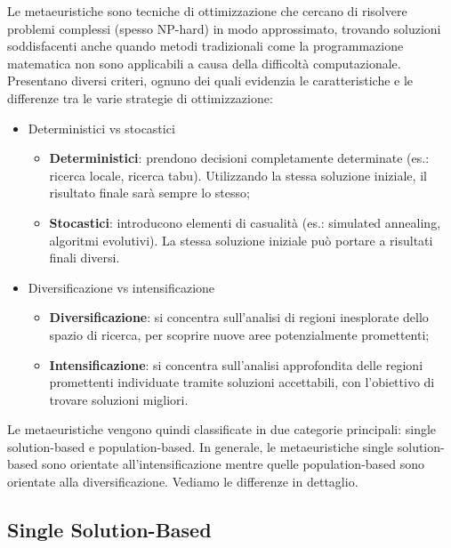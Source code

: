 Le metaeuristiche sono tecniche di ottimizzazione che cercano di risolvere problemi complessi (spesso NP-hard) in modo approssimato, trovando soluzioni soddisfacenti anche quando metodi tradizionali come la programmazione matematica non sono applicabili a causa della difficoltà computazionale. Presentano diversi criteri, ognuno dei quali evidenzia le caratteristiche e le differenze tra le varie strategie di ottimizzazione:
\begin{itemize}
    \item Deterministici vs stocastici
    \begin{itemize}
        \item \textbf{Deterministici}: prendono decisioni completamente determinate (es.: ricerca locale, ricerca tabu). Utilizzando la stessa soluzione iniziale, il risultato finale sarà sempre lo stesso;
        \item \textbf{Stocastici}: introducono elementi di casualità (es.: simulated annealing, algoritmi evolutivi). La stessa soluzione iniziale può portare a risultati finali diversi.
    \end{itemize}
     
    \item Diversificazione vs intensificazione
    \begin{itemize}
        \item \textbf{Diversificazione}: si concentra sull'analisi di regioni inesplorate dello spazio di ricerca, per scoprire nuove aree potenzialmente promettenti;
        \item \textbf{Intensificazione}: si concentra sull'analisi approfondita delle regioni promettenti individuate tramite soluzioni accettabili, con l'obiettivo di trovare soluzioni migliori.
    \end{itemize}
\end{itemize}

Le metaeuristiche vengono quindi classificate in due categorie principali: single solution-based e population-based. In generale, le metaeuristiche single solution-based sono orientate all'intensificazione mentre quelle population-based sono orientate alla diversificazione.
Vediamo le differenze in dettaglio.

\subsection{Single Solution-Based}

